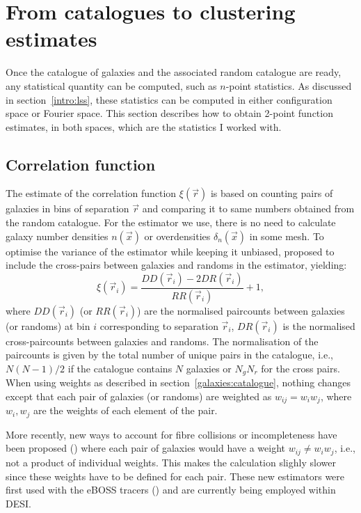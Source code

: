 \section{From catalogues to clustering estimates}
\label{galaxies:clustering}

Once the catalogue of galaxies and the associated random catalogue are ready, 
any statistical quantity can be computed, such as $n$-point statistics. 
As discussed in section~\ref{intro:lss}, these statistics can be computed 
in either configuration space or Fourier space. 
This section describes how to obtain 2-point function estimates, 
in both spaces, which are the statistics I worked with. 

\subsection{Correlation function}
\label{galaxies:clustering:correlation_function}

The estimate of the correlation function $\xi(\vec{r})$ is based on counting pairs of galaxies 
in bins of separation $\vec{r}$ and comparing it to same numbers obtained from the random catalogue. 
For the estimator we use, there is no need to calculate galaxy number densities $n(\vec{x})$  
or overdensities $\delta_n(\vec{x})$ in some mesh. To optimise the variance of the estimator 
while keeping it unbiased, \cite{landyBiasVarianceAngular1993} proposed to include the cross-pairs  
between galaxies and randoms in the estimator, yielding:
\begin{equation}
 \xi(\vec{r}_i) = \frac{DD(\vec{r}_i) - 2DR(\vec{r}_i)}{RR(\vec{r}_i)} + 1,
 \label{eq:landy-szalay}
\end{equation}
where $DD(\vec{r}_i)$ (or $RR(\vec{r}_i)$) are the normalised paircounts between galaxies (or randoms) 
at bin $i$ corresponding to separation $\vec{r}_i$, 
$DR(\vec{r}_i)$ is the normalised cross-paircounts between galaxies and randoms. 
The normalisation of the paircounts is given by the total number of unique pairs in the catalogue, 
i.e., $N(N-1)/2$ if the catalogue contains $N$ galaxies or $N_g N_r$ for the cross pairs. 
When using weights as described in section~\ref{galaxies:catalogue}, nothing changes except 
that each pair of galaxies (or randoms) are weighted as $w_{ij} = w_i w_j$, where $w_i, w_j$ are the 
weights of each element of the pair. 

More recently, new ways to account for fibre collisions 
or incompleteness have been proposed 
(\cite{bianchiUnbiasedClusteringEstimation2017, percivalUsingAngularPair2017}) where each pair 
of galaxies would have a weight $w_{ij} \neq w_i w_j$, i.e., not a product of individual weights. 
This makes the calculation slighly slower since these weights have to be defined for each pair. 
These new estimators were first used with the eBOSS tracers
(\cite{mohammadCompletedSDSSIVExtended2020}) and are currently being employed within DESI. 


